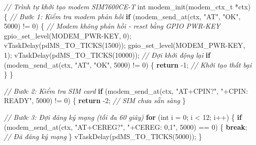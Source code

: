 \documentclass[13pt,a4paper]{extarticle}
\newenvironment{Shaded}{}{}
\newcommand{\CommentTok}[1]{\textcolor[rgb]{0.38,0.63,0.69}{\textit{#1}}}
\newcommand{\ControlFlowTok}[1]{\textcolor[rgb]{0.00,0.44,0.13}{\textbf{#1}}}
\newcommand{\DataTypeTok}[1]{\textcolor[rgb]{0.56,0.13,0.00}{#1}}
\newcommand{\DecValTok}[1]{\textcolor[rgb]{0.25,0.63,0.44}{#1}}
\newcommand{\NormalTok}[1]{#1}
\newcommand{\OperatorTok}[1]{\textcolor[rgb]{0.40,0.40,0.40}{#1}}
\newcommand{\StringTok}[1]{\textcolor[rgb]{0.25,0.44,0.63}{#1}}
\renewcommand{\\}{\thesislongtableorignewline\hline}%
\begin{document}
\begin{Shaded}
\begin{Highlighting}[]
\CommentTok{// Trình tự khởi tạo modem SIM7600CE{-}T}
\DataTypeTok{int}\NormalTok{ modem\_init}\OperatorTok{(}\NormalTok{modem\_ctx\_t }\OperatorTok{*}\NormalTok{ctx}\OperatorTok{)}
\OperatorTok{\{}
    \CommentTok{// Bước 1: Kiểm tra modem phản hồi}
    \ControlFlowTok{if} \OperatorTok{(}\NormalTok{modem\_send\_at}\OperatorTok{(}\NormalTok{ctx}\OperatorTok{,} \StringTok{"AT"}\OperatorTok{,} \StringTok{"OK"}\OperatorTok{,} \DecValTok{5000}\OperatorTok{)} \OperatorTok{!=} \DecValTok{0}\OperatorTok{)} \OperatorTok{\{}
        \CommentTok{// Modem không phản hồi {-} reset bằng GPIO PWR{-}KEY}
\NormalTok{        gpio\_set\_level}\OperatorTok{(}\NormalTok{MODEM\_PWR}\OperatorTok{{-}}\NormalTok{KEY}\OperatorTok{,} \DecValTok{0}\OperatorTok{);}
\NormalTok{        vTaskDelay}\OperatorTok{(}\NormalTok{pdMS\_TO\_TICKS}\OperatorTok{(}\DecValTok{1500}\OperatorTok{));}
\NormalTok{        gpio\_set\_level}\OperatorTok{(}\NormalTok{MODEM\_PWR}\OperatorTok{{-}}\NormalTok{KEY}\OperatorTok{,} \DecValTok{1}\OperatorTok{);}
\NormalTok{        vTaskDelay}\OperatorTok{(}\NormalTok{pdMS\_TO\_TICKS}\OperatorTok{(}\DecValTok{10000}\OperatorTok{));}  \CommentTok{// Đợi khởi động lại}
        \ControlFlowTok{if} \OperatorTok{(}\NormalTok{modem\_send\_at}\OperatorTok{(}\NormalTok{ctx}\OperatorTok{,} \StringTok{"AT"}\OperatorTok{,} \StringTok{"OK"}\OperatorTok{,} \DecValTok{5000}\OperatorTok{)} \OperatorTok{!=} \DecValTok{0}\OperatorTok{)} \OperatorTok{\{}
            \ControlFlowTok{return} \OperatorTok{{-}}\DecValTok{1}\OperatorTok{;}  \CommentTok{// Khởi tạo thất bại}
        \OperatorTok{\}}
    \OperatorTok{\}}

    \CommentTok{// Bước 2: Kiểm tra SIM card}
    \ControlFlowTok{if} \OperatorTok{(}\NormalTok{modem\_send\_at}\OperatorTok{(}\NormalTok{ctx}\OperatorTok{,} \StringTok{"AT+CPIN?"}\OperatorTok{,} \StringTok{"+CPIN: READY"}\OperatorTok{,} \DecValTok{5000}\OperatorTok{)} \OperatorTok{!=} \DecValTok{0}\OperatorTok{)} \OperatorTok{\{}
        \ControlFlowTok{return} \OperatorTok{{-}}\DecValTok{2}\OperatorTok{;}  \CommentTok{// SIM chưa sẵn sàng}
    \OperatorTok{\}}

    \CommentTok{// Bước 3: Đợi đăng ký mạng (tối đa 60 giây)}
    \ControlFlowTok{for} \OperatorTok{(}\DataTypeTok{int}\NormalTok{ i }\OperatorTok{=} \DecValTok{0}\OperatorTok{;}\NormalTok{ i }\OperatorTok{\textless{}} \DecValTok{12}\OperatorTok{;}\NormalTok{ i}\OperatorTok{++)} \OperatorTok{\{}
        \ControlFlowTok{if} \OperatorTok{(}\NormalTok{modem\_send\_at}\OperatorTok{(}\NormalTok{ctx}\OperatorTok{,} \StringTok{"AT+CEREG?"}\OperatorTok{,} \StringTok{"+CEREG: 0,1"}\OperatorTok{,} \DecValTok{5000}\OperatorTok{)} \OperatorTok{==} \DecValTok{0}\OperatorTok{)} \OperatorTok{\{}
            \ControlFlowTok{break}\OperatorTok{;}  \CommentTok{// Đã đăng ký mạng}
        \OperatorTok{\}}
\NormalTok{        vTaskDelay}\OperatorTok{(}\NormalTok{pdMS\_TO\_TICKS}\OperatorTok{(}\DecValTok{5000}\OperatorTok{));}
    \OperatorTok{\}}


\end{Highlighting}
\end{Shaded}
\end{document}
